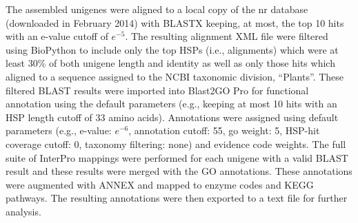 \documentclass[11pt]{article}
\begin{document}
The assembled unigenes were aligned to a local copy of the nr database
(downloaded in February 2014) with BLASTX \citep{citeulike:238188}
keeping, at most, the top 10 hits with an e-value cutoff of
$e^{-5}$. The resulting alignment XML file were filtered using
BioPython \citep[v.\ 1.6.4]{citeulike:4202607} to include only the top
HSPs (i.e., alignments) which were at least 30\% of both unigene
length and identity as well as only those hits which aligned to a
sequence assigned to the NCBI taxonomic division, ``Plants''. These
filtered BLAST results were imported into Blast2GO Pro \citep[v.\
2.7.2, bg2\_sep14]{citeulike:2733895} for functional annotation using
the default parameters (e.g., keeping at most 10 hits with an HSP
length cutoff of 33 amino acids).  Annotations were assigned using
default parameters (e.g., e-value: $e^{-6}$, annotation cutoff: 55, go
weight: 5, HSP-hit coverage cutoff: 0, taxonomy filtering: none) and
evidence code weights. The full suite of InterPro
\citep{citeulike:12942060} mappings were performed for each unigene
with a valid BLAST result and these results were merged with the GO
annotations.  These annotations were augmented with ANNEX
\citep{annex} and mapped to enzyme codes and KEGG
\citep{citeulike:9172127} pathways. The resulting annotations were
then exported to a text file for further analysis. 
\end{document}
